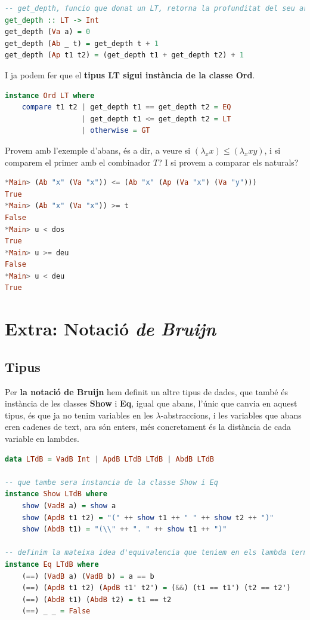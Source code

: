 \documentclass[10pt,a4paper]{article}
\begin{document}
\begin{lstlisting}[language=Haskell]
-- get_depth, funcio que donat un LT, retorna la profunditat del seu arbre de parsing
get_depth :: LT -> Int
get_depth (Va a) = 0
get_depth (Ab _ t) = get_depth t + 1
get_depth (Ap t1 t2) = (get_depth t1 + get_depth t2) + 1
\end{lstlisting}

I ja podem fer que el \textbf{tipus LT sigui instància de la classe Ord}.

\begin{lstlisting}[language=Haskell]
instance Ord LT where
    compare t1 t2 | get_depth t1 == get_depth t2 = EQ
                  | get_depth t1 <= get_depth t2 = LT
                  | otherwise = GT
\end{lstlisting}

Provem amb l'exemple d'abans, és a dir, a veure si $(\lambda_x x) \leq (\lambda_x x y)$, i si comparem el primer amb el combinador $T$? I si provem a comparar els naturals?

\begin{lstlisting}[language=Haskell]
*Main> (Ab "x" (Va "x")) <= (Ab "x" (Ap (Va "x") (Va "y")))
True
*Main> (Ab "x" (Va "x")) >= t
False
*Main> u < dos
True
*Main> u >= deu
False
*Main> u < deu
True
\end{lstlisting}

\clearpage

\section{Extra: Notació \textit{de Bruijn}}

\subsection{Tipus}

Per \textbf{la notació de Bruijn} hem definit un altre tipus de dades, que també és instància de les classes \textbf{Show} i \textbf{Eq}, igual que abans, l'únic que canvia en aquest tipus, és que ja no tenim variables en les $\lambda$-abstraccions, i les variables que abans eren cadenes de text, ara són enters, més concretament és la distància de cada variable en lambdes.

\begin{lstlisting}[language=Haskell]
data LTdB = VadB Int | ApdB LTdB LTdB | AbdB LTdB

-- que tambe sera instancia de la classe Show i Eq
instance Show LTdB where
    show (VadB a) = show a
    show (ApdB t1 t2) = "(" ++ show t1 ++ " " ++ show t2 ++ ")"
    show (AbdB t1) = "(\\" ++ ". " ++ show t1 ++ ")"

-- definim la mateixa idea d'equivalencia que teniem en els lambda termes pels lambda termes amb notacio de Bruijn
instance Eq LTdB where
    (==) (VadB a) (VadB b) = a == b
    (==) (ApdB t1 t2) (ApdB t1' t2') = (&&) (t1 == t1') (t2 == t2')
    (==) (AbdB t1) (AbdB t2) = t1 == t2
    (==) _ _ = False
\end{lstlisting}
\end{document}
